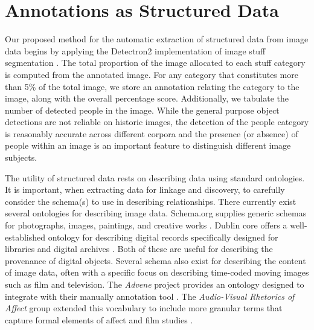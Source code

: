 \documentclass[10pt, a4paper]{article}
\begin{document}
\section{Annotations as Structured Data} \label{sec:method}

Our proposed method for the automatic extraction of structured data from image
data begins by applying the Detectron2 implementation of image stuff segmentation
\cite{wu2019detectron2}. The total proportion of the image allocated to each
stuff category is computed from the annotated image. For any category that
constitutes more than 5\% of the total image, we store an annotation relating the
category to the image, along with the overall percentage score. Additionally,
we tabulate the number of detected people in the image. While the general purpose
object detections are not reliable on historic images, the detection of the
people category is reasonably accurate across different corpora and the presence
(or absence) of people within an image is an important feature to distinguish
different image subjects.

The utility of structured data rests on describing data using standard
ontologies. It is important, when extracting data for linkage and discovery,
to carefully consider the schema(s) to use in describing relationships. There
currently exist several ontologies for describing image data. Schema.org
supplies generic schemas for photographs, images, paintings, and creative works
\cite{guha2016schema}. Dublin core offers a well-established ontology for
describing digital records specifically designed for libraries and digital
archives \cite{weibel1997dublin}. Both of these are useful for describing the
provenance of digital objects. Several schema also exist for describing the
content of image data, often with a specific focus on describing time-coded
moving images such as film and television. The \textit{Advene} project provides
an ontology designed to integrate with their manually annotation
tool \cite{aubert2005advene}. The \textit{Audio-Visual Rhetorics of Affect}
group extended this vocabulary to include more granular terms that capture
formal elements of affect and film studies \cite{agt2018semantic}.
\end{document}
